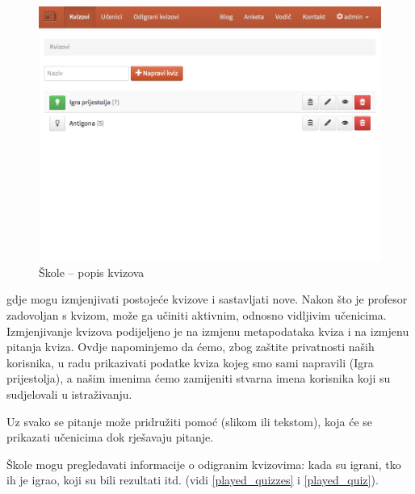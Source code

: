 \documentclass[11pt]{scrreprt}
\begin{document}
\begin{figure}[H]
  \includegraphics[width=\textwidth, clip=true, trim=0 10cm 0 0, fbox]{school/quizzes}
  \caption{Škole -- popis kvizova}
  \label{fig:school/quizzes}
\end{figure}

gdje mogu izmjenjivati postojeće kvizove i sastavljati nove. Nakon što je
profesor zadovoljan s kvizom, može ga učiniti aktivnim, odnosno vidljivim
učenicima. Izmjenjivanje kvizova podijeljeno je na izmjenu metapodataka kviza i
na izmjenu pitanja kviza. Ovdje napominjemo da ćemo, zbog zaštite privatnosti
naših korisnika, u radu prikazivati podatke kviza kojeg smo sami napravili
(Igra prijestolja), a našim imenima ćemo zamijeniti stvarna imena korisnika
koji su sudjelovali u istraživanju.

Uz svako se pitanje može pridružiti pomoć (slikom ili tekstom), koja će se
prikazati učenicima dok rješavaju pitanje.

Škole mogu pregledavati informacije o odigranim kvizovima: kada su igrani, tko
ih je igrao, koji su bili rezultati itd. (vidi \ref{played_quizzes} i \ref{played_quiz}).
\end{document}
